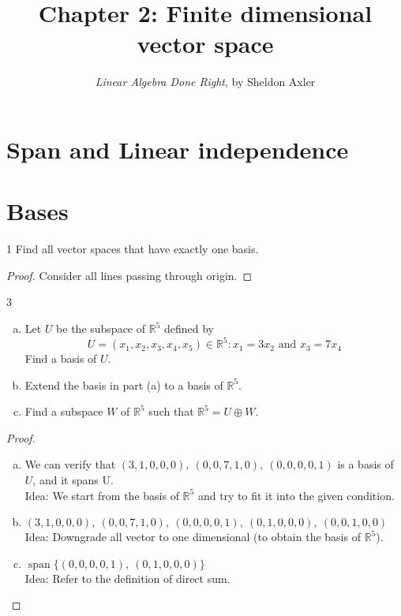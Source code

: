 \documentclass{extarticle}
\title{\vspace{-2em}Chapter 2: Finite dimensional vector space}
\author{\emph{Linear Algebra Done Right}, by Sheldon Axler}
\date{}
\newenvironment{problem}[1]{\begin{prob*}{#1}{}}{\end{prob*}}
\newcommand{\R}{\mathbb{R}}
\DeclareMathOperator{\Span}{span}
\begin{document}
\maketitle

\newpage
\tableofcontents
\newpage



\section{Span and Linear independence}

\section{Bases}


\begin{problem}{1}
  Find all vector spaces that have exactly one basis.
\end{problem}

\begin{proof}
\par Consider all lines passing through origin.
\end{proof}

\begin{problem}{3}
\begin{enumerate}[(a)]
\item Let $U$ be the subspace of $\mathbb{R}^5$ defined by
\[ U = {(x_1, x_2, x_3, x_4, x_5) \in \mathbb{R}^5 : x_1  = 3 x_2 \text{ and } x_3 = 7 x_4}\]
Find a basis of $U$.
\item Extend the basis in part (a) to a basis of $\R^5$.
\item Find a subspace $W$ of $\R^5$ such that \( \R^5 = U \oplus W\).
\end{enumerate}
\end{problem}

\begin{proof}
\begin{enumerate}[(a)]
\item We can verify that \((3, 1, 0, 0, 0), ~ (0, 0, 7, 1, 0), ~ (0, 0, 0, 0, 1)\)
is a basis of $U$, and it spans U.
\\ Idea: We start from the basis of $\R^5$ and try to fit it into the given condition.

\item \((3, 1, 0, 0, 0), ~ (0, 0, 7, 1, 0), ~ (0, 0, 0, 0, 1), ~ (0, 1, 0, 0, 0), ~ (0, 0, 1, 0, 0)\)
\\ Idea: Downgrade all vector to one dimensional (to obtain the basis of $\R^5$).

\item \( \Span\{(0, 0, 0, 0, 1), ~ (0, 1, 0, 0, 0)\} \)
\\ Idea: Refer to the definition of direct sum.
\end{enumerate}
\end{proof}
\end{document}
